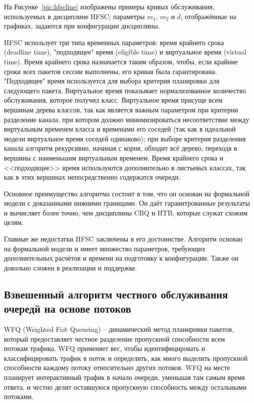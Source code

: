 		На Рисунке~\ref{pic:hfscline} изображены примеры кривых обслуживания, используемых
		в дисциплине HFSC; параметры $m_1$, $m_2$ и $d$, отображённые на графиках, задаются
		при конфигурации дисциплины.\cite{hfscguide}

        HFSC использует три типа временных параметров: время крайнего срока (deadline
        time), "подходящее" время (eligible time) и виртуальное время (virtual time). Время крайнего
        срока назначается таким образом, чтобы, если крайние сроки всех пакетов сессии
        выполнены, его кривая была гарантирована. "Подходящее" время используется для
        выбора критерия планировки для следующего пакета. Виртуальное время показывает
        нормализованное количество обслуживания, которое получил класс. Виртуальное
        время присуще всем вершинам дерева классов, так как является важным параметром
        при критерии разделение канала, при котором должно минимизироваться
        несоответствие между виртуальным временем класса и временами его соседей
        (так как в идеальной модели виртуальное время соседей одинаково); при выборе
        критерия разделения канала алгоритм рекурсивно, начиная с корня, обходит всё
        дерево, переходя в вершины с наименьшим виртуальным временем. Время крайнего
        срока и <<подходящее>> время используются дополнительно в листьевых классах,
        так как в этих вершинах непосредственно содержатся очереди.\cite{hfsc}

		Основное преимущество алгоритма состоит в том, что он основан
		на формальной модели с доказанными нижними границами. Он даёт гаранитрованные
		результаты и вычисляет более точно, чем дисциплины CBQ и HTB, которые
		служат схожим целям.

		Главные же недостатки HFSC заключены в его достоинстве. Алгоритм основан
		на формальной модели и имеет множество параметров, требующих дополнительных
		расчётов и времени на подготовку к конфигурации. Также он довольно сложен
		в реализации и поддержке. 

    \subsection{Взвешенный алгоритм честного обслуживания очередй на основе потоков}

    WFQ (Weighted Fait Queueing) -- динамический метод планировки пакетов, который
    предоставляет честное разделение пропускной способности всем потокам трафика.
    WFQ применяет вес, чтобы идентифицировать и классифицировать трафик
    в поток и определить, как много выделить пропускной способности каждому
    потоку относительно других потоков. WFQ на месте планирует интерактивный трафик в начало очереди,
    уменьшая там самым время ответа, и честно делит оставшуюся пропускную
    способность между остальными потоками. \cite{ciscoguide}

